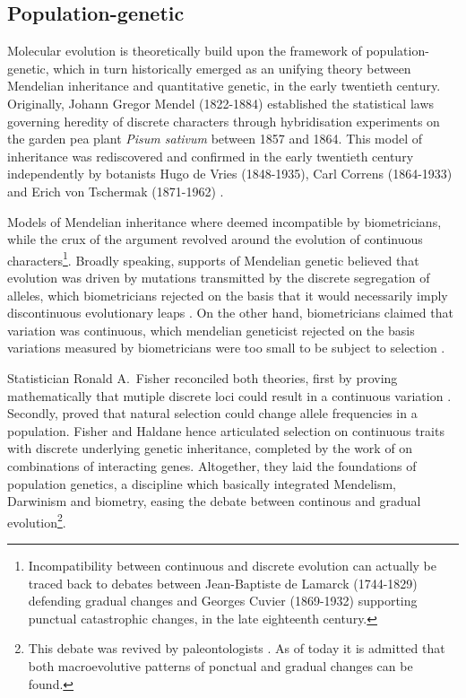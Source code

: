 \subsection{Population-genetic}
Molecular evolution is theoretically build upon the framework of population-genetic, which in turn historically emerged as an unifying theory between Mendelian inheritance and quantitative genetic, in the early twentieth century.
Originally, Johann Gregor Mendel (1822-1884) established the statistical laws governing heredity of discrete characters through  hybridisation experiments on the garden pea plant \textit{Pisum sativum} between 1857 and 1864.
This model of inheritance was rediscovered and confirmed in the early twentieth century independently by botanists Hugo de Vries (1848-1935), Carl Correns (1864-1933) and Erich von Tschermak (1871-1962) \citep{dunn2003gregor}.

Models of Mendelian inheritance where deemed incompatible by biometricians, while the crux of the argument revolved around the evolution of continuous characters\footnote{Incompatibility between continuous and discrete evolution can actually be traced back to debates between Jean-Baptiste de Lamarck (1744-1829) defending gradual changes and Georges Cuvier (1869-1932) supporting punctual catastrophic changes, in the late eighteenth century.}.
Broadly speaking, supports of Mendelian genetic believed that evolution was driven by mutations transmitted by the discrete segregation of alleles, which biometricians rejected on the basis that it would necessarily imply discontinuous evolutionary leaps \citep{bowler2003evolution}.
On the other hand, biometricians claimed that variation was continuous, which mendelian geneticist rejected on the basis variations measured by biometricians were too small to be subject to selection \citep{provine2001origins}.

Statistician Ronald A.\ Fisher reconciled both theories, first by proving mathematically that mutiple discrete loci could result in a continuous variation \citep{fisher1919xv}.
Secondly, \citet{fisher1930genetical, haldane1932causes} proved that natural selection could change \gls{allele} frequencies in a population. 
Fisher and Haldane hence articulated selection on continuous traits with discrete underlying genetic inheritance, completed by the work of \citet{wright1932roles} on combinations of interacting genes.
Altogether, they laid the foundations of population genetics, a discipline which basically integrated Mendelism, Darwinism and biometry, easing the debate between continous and gradual evolution\footnote{This debate was revived by paleontologists \citet*{Gould1972}. As of today it is admitted that both macroevolutive patterns of ponctual and gradual changes can be found.}.

